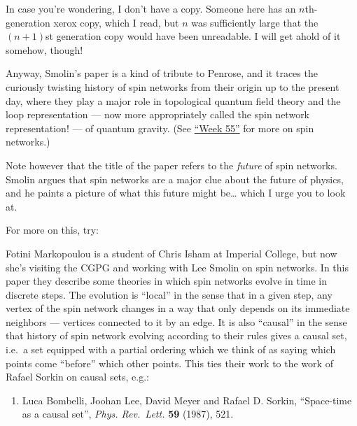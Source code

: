 \documentclass{article}
\def\tightlist{}
\renewcommand{\texttt}[1]{%
  \begingroup
  \ttfamily
  \begingroup\lccode`~=`/\lowercase{\endgroup\def~}{/\discretionary{}{}{}}%
  \begingroup\lccode`~=`[\lowercase{\endgroup\def~}{[\discretionary{}{}{}}%
  \begingroup\lccode`~=`.\lowercase{\endgroup\def~}{.\discretionary{}{}{}}%
  \catcode`/=\active\catcode`[=\active\catcode`.=\active
  \scantokens{#1\noexpand}%
  \endgroup
}
\begin{document}
In case you're wondering, I don't have a copy. Someone here has an
\(n\)th-generation xerox copy, which I read, but \(n\) was sufficiently
large that the \((n+1)\)st generation copy would have been unreadable. I
will get ahold of it somehow, though!

Anyway, Smolin's paper is a kind of tribute to Penrose, and it traces
the curiously twisting history of spin networks from their origin up to
the present day, where they play a major role in topological quantum
field theory and the loop representation --- now more appropriately
called the spin network representation! --- of quantum gravity. (See
\protect\hyperlink{week55}{``Week 55''} for more on spin networks.)

Note however that the title of the paper refers to the \emph{future} of
spin networks. Smolin argues that spin networks are a major clue about
the future of physics, and he paints a picture of what this future might
be\ldots{} which I urge you to look at.

For more on this, try:


Fotini Markopoulou is a student of Chris Isham at Imperial College, but
now she's visiting the CGPG and working with Lee Smolin on spin
networks. In this paper they describe some theories in which spin
networks evolve in time in discrete steps. The evolution is ``local'' in
the sense that in a given step, any vertex of the spin network changes
in a way that only depends on its immediate neighbors --- vertices
connected to it by an edge. It is also ``causal'' in the sense that
history of spin network evolving according to their rules gives a causal
set, i.e.~a set equipped with a partial ordering which we think of as
saying which points come ``before'' which other points. This ties their
work to the work of Rafael Sorkin on causal sets, e.g.:

\begin{enumerate}
\def\labelenumi{\arabic{enumi})}
\setcounter{enumi}{3}
\tightlist
\item
  Luca Bombelli, Joohan Lee, David Meyer and Rafael D. Sorkin,
  ``Space-time as a causal set'', \emph{Phys. Rev.~Lett.} \textbf{59}
  (1987), 521.
\end{enumerate}
\end{document}

